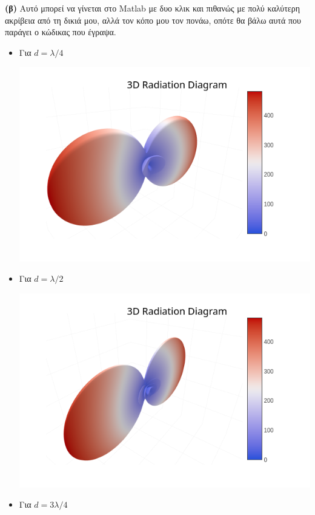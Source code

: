 \documentclass[12pt]{article}
\begin{document}
\textbf{(β)} Αυτό μπορεί να γίνεται στο Matlab με δυο κλικ και πιθανώς με πολύ καλύτερη ακρίβεια από τη δικιά μου, αλλά τον κόπο μου τον πονάω, οπότε θα βάλω αυτά που παράγει ο κώδικας που έγραψα. 
\begin{itemize}
    \item Για \(d = \lambda/4\)
    \begin{center}
        \includegraphics*[scale=0.6]{025_3d.png}
    \end{center}
    \item Για \(d = \lambda/2\)
    \begin{center}
        \includegraphics*[scale=0.6]{050_3d.png}
    \end{center}
    \item Για \(d = 3\lambda/4\)
    \begin{center}

\end{center}
\end{itemize}
\end{document}

